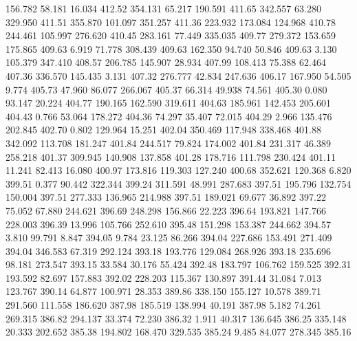  156.782   58.181   16.034       412.52
 354.131   65.217  190.591       411.65
 342.557   63.280  329.950       411.51
 355.870  101.097  351.257       411.36
 223.932  173.084  124.968       410.78
 244.461  105.997  276.620       410.45
 283.161   77.449  335.035       409.77
 279.372  153.659  175.865       409.63
   6.919   71.778  308.439       409.63
 162.350   94.740   50.846       409.63
   3.130  105.379  347.410       408.57
 206.785  145.907   28.934       407.99
 108.413   75.388   62.464       407.36
 336.570  145.435    3.131       407.32
 276.777   42.834  247.636       406.17
 167.950   54.505    9.774       405.73
  47.960   86.077  266.067       405.37
  66.314   49.938   74.561       405.30
   0.080   93.147   20.224       404.77
 190.165  162.590  319.611       404.63
 185.961  142.453  205.601       404.43
   0.766   53.064  178.272       404.36
  74.297   35.407   72.015       404.29
   2.966  135.476  202.845       402.70
   0.802  129.964   15.251       402.04
 350.469  117.948  338.468       401.88
 342.092  113.708  181.247       401.84
 244.517   79.824  174.002       401.84
 231.317   46.389  258.218       401.37
 309.945  140.908  137.858       401.28
 178.716  111.798  230.424       401.11
  11.241   82.413   16.080       400.97
 173.816  119.303  127.240       400.68
 352.621  120.368    6.820       399.51
   0.377   90.442  322.344       399.24
 311.591   48.991  287.683       397.51
 195.796  132.754  150.004       397.51
 277.333  136.965  214.988       397.51
 189.021   69.677   36.892       397.22
  75.052   67.880  244.621       396.69
 248.298  156.866   22.223       396.64
 193.821  147.766  228.003       396.39
  13.996  105.766  252.610       395.48
 151.298  153.387  244.662       394.57
   3.810   99.791    8.847       394.05
   9.784   23.125   86.266       394.04
 227.686  153.491  271.409       394.04
 346.583   67.319  292.124       393.18
 193.776  129.084  268.926       393.18
 235.696   98.181  273.547       393.15
  33.584   30.176   55.424       392.48
 183.797  106.762  159.525       392.31
 193.592   82.697  157.883       392.02
 228.203  115.367  130.897       391.44
  31.084    7.013  123.767       390.14
  64.877  100.971   28.353       389.86
 338.150  155.127   10.578       389.71
 291.560  111.558  186.620       387.98
 185.519  138.994   40.191       387.98
   5.182   74.261  269.315       386.82
 294.137   33.374   72.230       386.32
   1.911   40.317  136.645       386.25
 335.148   20.333  202.652       385.38
 194.802  168.470  329.535       385.24
   9.485   84.077  278.345       385.16
